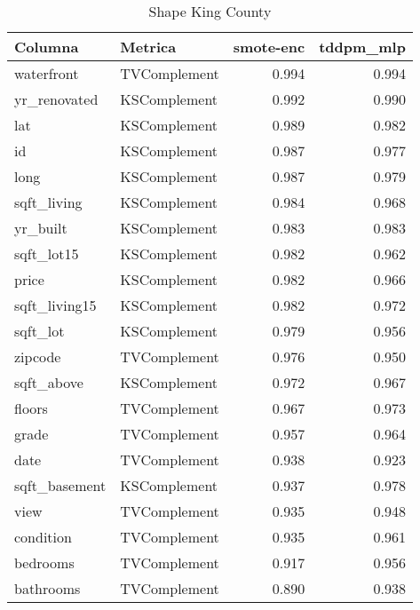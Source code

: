\begin{table}[H]
\centering
\caption{Shape King County}
\label{table-shape-king county-a-2}
\begin{tabular}{|l|l|r|r|}
\hline
\rowcolor[gray]{0.8}
Columna & Metrica & smote-enc & tddpm\_mlp \\
\hline waterfront & TVComplement & 0.994 & \cellcolor[HTML]{EEEEEE} 0.994 \\
\hline yr\_renovated & KSComplement & \cellcolor[HTML]{EEEEEE} 0.992 & 0.990 \\
\hline lat & KSComplement & \cellcolor[HTML]{EEEEEE} 0.989 & 0.982 \\
\hline id & KSComplement & \cellcolor[HTML]{EEEEEE} 0.987 & 0.977 \\
\hline long & KSComplement & \cellcolor[HTML]{EEEEEE} 0.987 & 0.979 \\
\hline sqft\_living & KSComplement & \cellcolor[HTML]{EEEEEE} 0.984 & 0.968 \\
\hline yr\_built & KSComplement & 0.983 & \cellcolor[HTML]{EEEEEE} 0.983 \\
\hline sqft\_lot15 & KSComplement & \cellcolor[HTML]{EEEEEE} 0.982 & 0.962 \\
\hline price & KSComplement & \cellcolor[HTML]{EEEEEE} 0.982 & 0.966 \\
\hline sqft\_living15 & KSComplement & \cellcolor[HTML]{EEEEEE} 0.982 & 0.972 \\
\hline sqft\_lot & KSComplement & \cellcolor[HTML]{EEEEEE} 0.979 & 0.956 \\
\hline zipcode & TVComplement & \cellcolor[HTML]{EEEEEE} 0.976 & 0.950 \\
\hline sqft\_above & KSComplement & \cellcolor[HTML]{EEEEEE} 0.972 & 0.967 \\
\hline floors & TVComplement & 0.967 & \cellcolor[HTML]{EEEEEE} 0.973 \\
\hline grade & TVComplement & 0.957 & \cellcolor[HTML]{EEEEEE} 0.964 \\
\hline date & TVComplement & \cellcolor[HTML]{EEEEEE} 0.938 & 0.923 \\
\hline sqft\_basement & KSComplement & 0.937 & \cellcolor[HTML]{EEEEEE} 0.978 \\
\hline view & TVComplement & 0.935 & \cellcolor[HTML]{EEEEEE} 0.948 \\
\hline condition & TVComplement & 0.935 & \cellcolor[HTML]{EEEEEE} 0.961 \\
\hline bedrooms & TVComplement & 0.917 & \cellcolor[HTML]{EEEEEE} 0.956 \\
\hline bathrooms & TVComplement & 0.890 & \cellcolor[HTML]{EEEEEE} 0.938 \\
\hline
\end{tabular}
\end{table}
